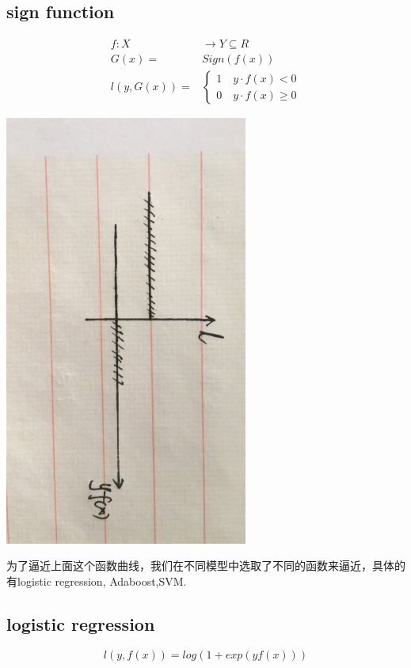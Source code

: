 \documentclass[lang=cn,11pt,a4paper]{elegantpaper}
\theoremstyle{plain}
\theoremstyle{remark}
\begin{document}
\subsection{sign function}
\begin{equation*}
    \begin{aligned}
        f:X&\rightarrow Y \subseteq R\\
        G(x) =& Sign(f(x))\\
        l(y,G(x)) =& \left\{\begin{array}{l}
         1\quad y\cdot f(x) <0\\
         0\quad y\cdot f(x) \geq 0  
        \end{array}\right.
    \end{aligned}
\end{equation*}
\begin{center}
    \includegraphics[width = 8cm,angle = 90]{fig/loss.png}
\end{center}
为了逼近上面这个函数曲线，我们在不同模型中选取了不同的函数来逼近，具体的有logistic regression, Adaboost,SVM.

\subsection{logistic regression}
\begin{equation*}
    l(y,f(x)) = log(1+exp(yf(x)))
\end{equation*}
\end{document}
